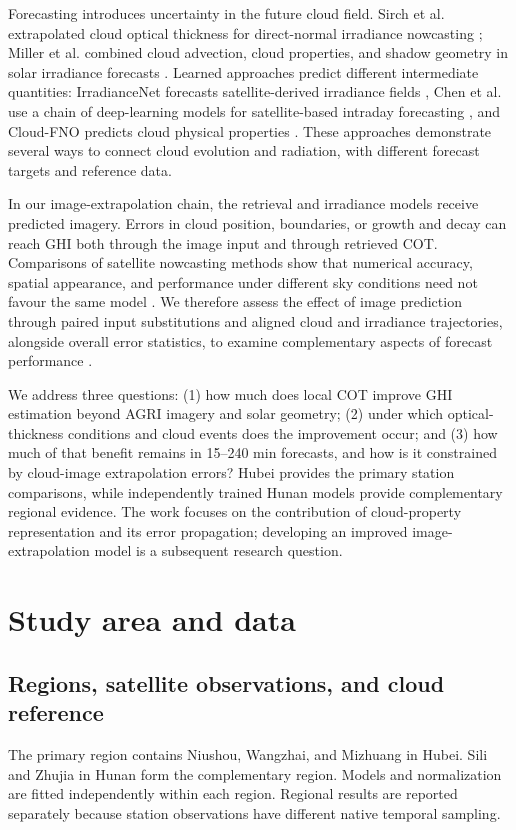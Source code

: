 \documentclass[11pt]{article}
\begin{document}
Forecasting introduces uncertainty in the future cloud field. Sirch et al. extrapolated cloud optical thickness for direct-normal irradiance nowcasting \cite{sirch2017}; Miller et al. combined cloud advection, cloud properties, and shadow geometry in solar irradiance forecasts \cite{miller2018}. Learned approaches predict different intermediate quantities: IrradianceNet forecasts satellite-derived irradiance fields \cite{nielsen2021}, Chen et al. use a chain of deep-learning models for satellite-based intraday forecasting \cite{chen2024}, and Cloud-FNO predicts cloud physical properties \cite{zhang2026}. These approaches demonstrate several ways to connect cloud evolution and radiation, with different forecast targets and reference data.

In our image-extrapolation chain, the retrieval and irradiance models receive predicted imagery. Errors in cloud position, boundaries, or growth and decay can reach GHI both through the image input and through retrieved COT. Comparisons of satellite nowcasting methods show that numerical accuracy, spatial appearance, and performance under different sky conditions need not favour the same model \cite{cui2024}. We therefore assess the effect of image prediction through paired input substitutions and aligned cloud and irradiance trajectories, alongside overall error statistics, to examine complementary aspects of forecast performance \cite{yang2020}.

We address three questions: (1) how much does local COT improve GHI estimation beyond AGRI imagery and solar geometry; (2) under which optical-thickness conditions and cloud events does the improvement occur; and (3) how much of that benefit remains in 15--240 min forecasts, and how is it constrained by cloud-image extrapolation errors? Hubei provides the primary station comparisons, while independently trained Hunan models provide complementary regional evidence. The work focuses on the contribution of cloud-property representation and its error propagation; developing an improved image-extrapolation model is a subsequent research question.

\section{Study area and data}
\subsection{Regions, satellite observations, and cloud reference}
The primary region contains Niushou, Wangzhai, and Mizhuang in Hubei. Sili and Zhujia in Hunan form the complementary region. Models and normalization are fitted independently within each region. Regional results are reported separately because station observations have different native temporal sampling.
\end{document}

